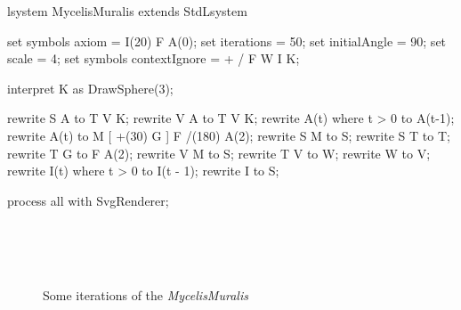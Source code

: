 \begin{LsystemBreak}
lsystem MycelisMuralis extends StdLsystem {
	set symbols axiom = I(20) F A(0);
	set iterations = 50;
	set initialAngle = 90;
	set scale = 4;
	set symbols contextIgnore = + / F W I K;

	interpret K as DrawSphere(3);

	rewrite {S} A to T V K;
	rewrite {V} A to T V K;
	rewrite A(t) where t > 0 to A(t-1);
	rewrite A(t)             to M [ +(30) G ] F /(180) A(2);
	rewrite {S} M     to S;
	rewrite     S {T} to T;
	rewrite {T} G     to F A(2);
	rewrite {V} M     to S;
	rewrite     T {V} to W;
	rewrite     W     to V;
	rewrite I(t) where t > 0 to I(t - 1);
	rewrite I                to S;
}
process all with SvgRenderer;
\end{LsystemBreak}

\begin{figure}[p]
	 ~
	 ~
	 ~
	 ~
	 ~
	 ~
	 ~
	 \\
	 ~
	 ~
	 \\
	 ~
	 ~
	\caption{Some iterations of the \emph{MycelisMuralis} \lsystem}
	\label{fig:MycelisMuralis}
\end{figure}





